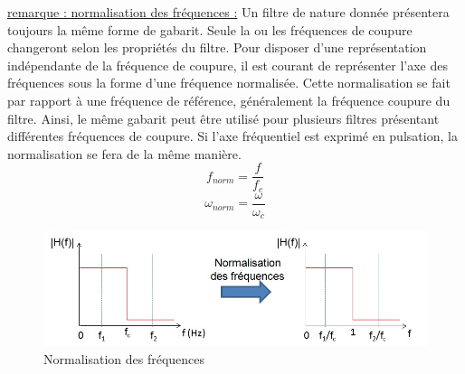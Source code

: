 \documentclass[]{book}
\begin{document}
{	
	\underline{remarque : normalisation des fréquences :}
	Un filtre de nature donnée présentera toujours la même forme de gabarit. Seule la ou les fréquences de coupure changeront selon les propriétés du filtre. Pour disposer d'une représentation indépendante de la fréquence de coupure, il est courant de représenter l'axe des fréquences sous la forme d'une fréquence normalisée. Cette normalisation se fait par rapport à une fréquence de référence, généralement la fréquence coupure du filtre. Ainsi, le même gabarit peut être utilisé pour plusieurs filtres présentant différentes fréquences de coupure. Si l'axe fréquentiel est exprimé en pulsation, la normalisation se fera de la même manière.
	\begin{equation}\label{key}
	f_{norm} = \frac{f}{f_{c}}
	\end{equation}
	\begin{equation}\label{key}
	\omega_{norm} = \frac{\omega}{\omega_{c}}
	\end{equation}
	
	\begin{figure}[h!]
		\centering
		\includegraphics[scale=0.6]{images/freq_norm.jpg}
		\caption{Normalisation des fréquences}	
		\label{Fig:freq_norm} 
	\end{figure}

}
\end{document}
